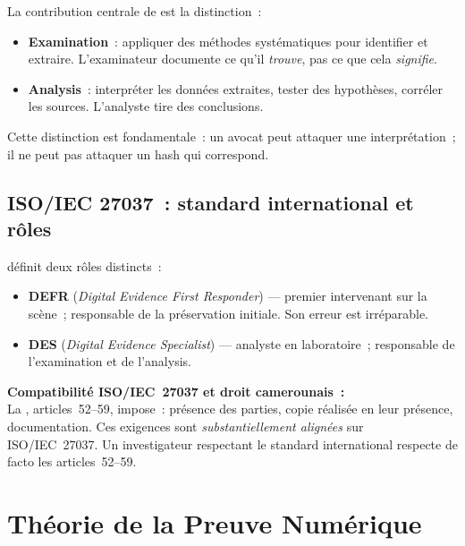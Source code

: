 La contribution centrale de  \cite{nist80086} est la
distinction~:
\begin{itemize}
    \item \textbf{Examination}~: appliquer des méthodes systématiques pour
          identifier et extraire. L'examinateur documente ce qu'il \emph{trouve},
          pas ce que cela \emph{signifie}.
    \item \textbf{Analysis}~: interpréter les données extraites, tester des
          hypothèses, corréler les sources. L'analyste tire des conclusions.
\end{itemize}

Cette distinction est fondamentale~: un avocat peut attaquer une interprétation~;
il ne peut pas attaquer un hash qui correspond.

\subsection{ISO/IEC 27037~: standard international et rôles}

 définit deux rôles distincts~:
\begin{itemize}
    \item \textbf{DEFR} (\textit{Digital Evidence First Responder}) ---
          premier intervenant sur la scène~; responsable de la préservation
          initiale. Son erreur est irréparable.
    \item \textbf{DES} (\textit{Digital Evidence Specialist}) --- analyste
          en laboratoire~; responsable de l'examination et de l'analysis.
\end{itemize}

\begin{boxjuris}
\textbf{Compatibilité ISO/IEC~27037 et droit camerounais~:}\\[0.3ex]
La , articles~52--59, impose~: présence des parties,
copie réalisée en leur présence, documentation. Ces exigences sont
\emph{substantiellement alignées} sur ISO/IEC~27037. Un investigateur
respectant le standard international respecte de facto les articles~52--59.
\end{boxjuris}

\section{Théorie de la Preuve Numérique}
\label{sec:theorie-preuve}

